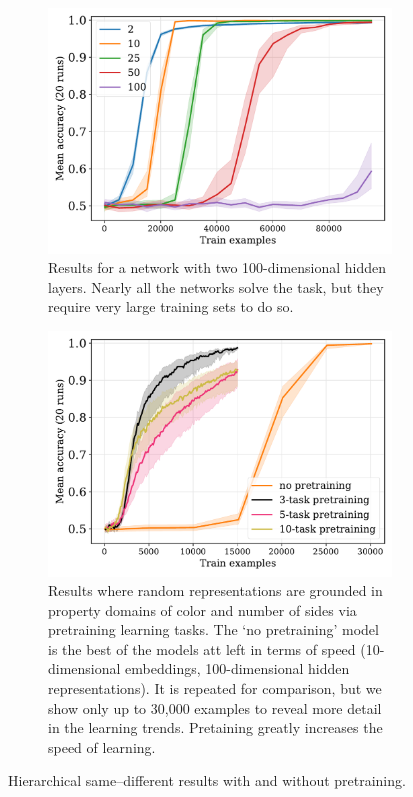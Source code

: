 \documentclass{article}
\newcommand{\update}[1]{{\color{darkblue}#1}}
\begin{document}
\begin{figure}[tp]
  \centering
  \begin{subfigure}[t]{0.48\linewidth}
    \centering
   \includegraphics[width=1\linewidth]{../fig/flatpremack-h2-train_size-embed_dim-hidden_dim=100.pdf}
   \caption{Results for a network with two 100-dimensional hidden layers. Nearly all the networks solve the task, but they require very large training sets to do so.}
   \label{fig:premack-h2-flat-results}
  \end{subfigure}
  \hfill
  \begin{subfigure}[t]{0.48\linewidth}
    \centering
    \includegraphics[width=1\linewidth]{../fig/flatpremack-h2-pretrain-compare-train_size-pretrained-embed_dim=None.pdf}
    \caption{\update{Results where random representations are grounded in property domains of color and number of sides via pretraining learning tasks.  The `no pretraining' model is the best of the models att left in terms of speed (10-dimensional embeddings, 100-dimensional hidden representations). It is repeated for comparison, but we show only up to 30,000 examples to reveal more detail in the learning trends. Pretaining greatly increases the speed of learning.}}
    \label{fig:premack-h2-pretrain}
  \end{subfigure}
  \caption{\update{Hierarchical same--different results with and without pretraining.}}
\end{figure}
\end{document}
